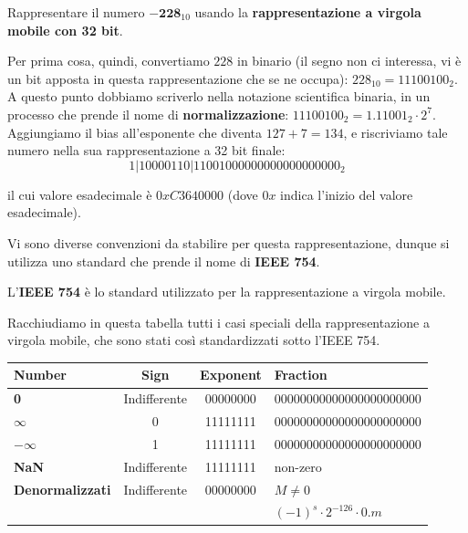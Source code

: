 \documentclass[11pt, a4paper, titlepage, oneside]{scrbook}
\begin{document}
\Esempio \nopagebreak

Rappresentare il numero $\bm{-228}_{10}$ usando la \textbf{rappresentazione a virgola mobile con 32 bit}. \nopagebreak

Per prima cosa, quindi, convertiamo $228$ in binario (il segno non ci interessa, vi è un bit apposta in questa rappresentazione che se ne occupa): $228_{10} = 11100100_2$. A questo punto dobbiamo scriverlo nella notazione scientifica binaria, in un processo che prende il nome di \textbf{normalizzazione}: $11100100_2 = 1.11001_2 \cdot 2^7$. Aggiungiamo il bias all'esponente che diventa $127 + 7 = 134$, e riscriviamo tale numero nella sua rappresentazione a 32 bit finale:
\[
1 | 10000110 | 11001000000000000000000_2
\]

il cui valore esadecimale è $0xC3640000$ (dove $0x$ indica l'inizio del valore esadecimale).

Vi sono diverse convenzioni da stabilire per questa rappresentazione, dunque si utilizza uno standard che prende il nome di \textbf{IEEE 754}.

\begin{Definizione}[IEEE 754]
\label{def-IEEE754}
L'\textbf{IEEE 754} è lo standard utilizzato per la rappresentazione a virgola mobile.
\end{Definizione}

Racchiudiamo in questa tabella tutti i casi speciali della rappresentazione a virgola mobile, che sono stati così standardizzati sotto l'IEEE 754.

\begin{center}
\begin{tabular}{|l|c|c|l|}
\hline
Number & Sign & Exponent & Fraction \\
\hline
\textbf{0} & Indifferente & 00000000 & 00000000000000000000000 \\
\hline
$\bm{\infty}$ & 0 & 11111111 & 00000000000000000000000 \\
\hline
$\bm{-\infty}$ & 1 & 11111111 & 00000000000000000000000 \\
\hline
\textbf{NaN} & Indifferente & 11111111 & non-zero \\
\hline
\textbf{Denormalizzati} & Indifferente & 00000000 & $M \neq 0$ \\
 & & & $(-1)^s \cdot 2^{-126} \cdot 0.m$ \\
\hline
\end{tabular}
\end{center}
\end{document}
